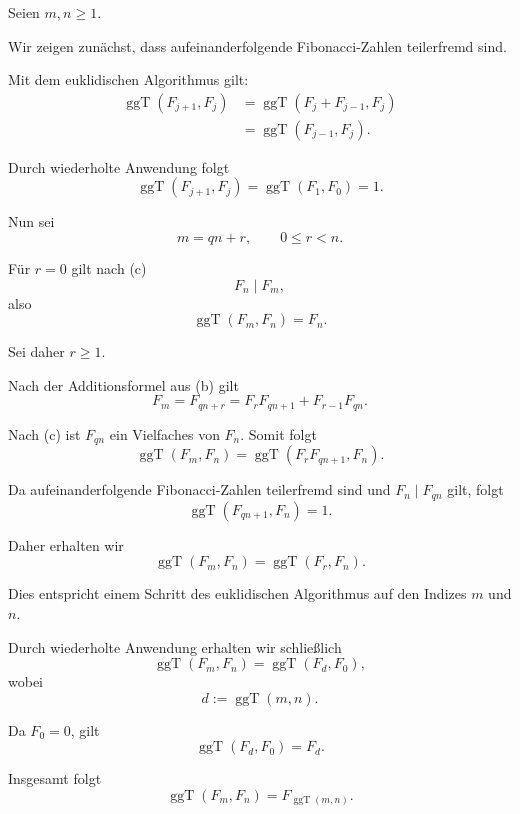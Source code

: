 \documentclass{report}
\begin{document}
\begin{myproof}
  Seien $m,n\ge1$.

  Wir zeigen zunächst, dass aufeinanderfolgende
  Fibonacci-Zahlen teilerfremd sind.

  Mit dem euklidischen Algorithmus gilt:
  \begin{align*}
    \operatorname{ggT}(F_{j+1},F_j)
    &=\operatorname{ggT}(F_j+F_{j-1},F_j)\\
    &=\operatorname{ggT}(F_{j-1},F_j).
  \end{align*}

  Durch wiederholte Anwendung folgt
  \[
    \operatorname{ggT}(F_{j+1},F_j)
    =\operatorname{ggT}(F_1,F_0)=1.
  \]

  \medskip
  Nun sei
  \[
    m=qn+r,
    \qquad 0\le r<n.
  \]

  Für $r=0$ gilt nach (c)
  \[
    F_n\mid F_m,
  \]
  also
  \[
    \operatorname{ggT}(F_m,F_n)
    =F_n.
  \]

  Sei daher $r\ge1$.

  Nach der Additionsformel aus (b) gilt
  \[
    F_m
    =F_{qn+r}
    =F_rF_{qn+1}+F_{r-1}F_{qn}.
  \]

  Nach (c) ist $F_{qn}$ ein Vielfaches
  von $F_n$. Somit folgt
  \[
    \operatorname{ggT}(F_m,F_n)
    =\operatorname{ggT}(F_rF_{qn+1},F_n).
  \]

  Da aufeinanderfolgende Fibonacci-Zahlen
  teilerfremd sind und $F_n\mid F_{qn}$
  gilt, folgt
  \[
    \operatorname{ggT}(F_{qn+1},F_n)=1.
  \]

  Daher erhalten wir
  \[
    \operatorname{ggT}(F_m,F_n)
    =\operatorname{ggT}(F_r,F_n).
  \]

  Dies entspricht einem Schritt des
  euklidischen Algorithmus auf den Indizes
  $m$ und $n$.

  Durch wiederholte Anwendung erhalten wir
  schließlich
  \[
    \operatorname{ggT}(F_m,F_n)
    =\operatorname{ggT}(F_d,F_0),
  \]
  wobei
  \[
    d:=\operatorname{ggT}(m,n).
  \]

  Da $F_0=0$, gilt
  \[
    \operatorname{ggT}(F_d,F_0)=F_d.
  \]

  Insgesamt folgt
  \[
    \boxed{
      \operatorname{ggT}(F_m,F_n)
      =F_{\operatorname{ggT}(m,n)}.
    }
  \]
\end{myproof}

\newpage


\sol

\end{document}
